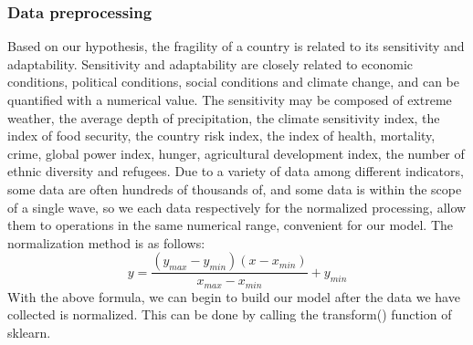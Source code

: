 \documentclass{mcmthesis}
\begin{document}
\newpage
\subsubsection{Data preprocessing}
Based on our hypothesis, the fragility of a country is related to its 
sensitivity and adaptability. Sensitivity and adaptability are closely 
related to economic conditions, political conditions, social conditions and 
climate change, and can be quantified with a numerical value. The sensitivity 
may be composed of extreme weather, the average depth of precipitation, the 
climate sensitivity index, the index of food security, the country risk index, 
the index of health, mortality, crime, global power index, hunger, agricultural 
development index, the number of ethnic diversity and refugees. Due to a variety 
of data among different indicators, some data are often hundreds of thousands of, 
and some data is within the scope of a single wave, so we each data respectively 
for the normalized processing, allow them to operations in the same numerical range, 
convenient for our model. The normalization method is as follows:
\[ y=\frac{\left ( y_{max}-y_{min} \right )\left ( x-x_{min} \right )}{x_{max}-x_{min}}+y_{min} \]
With the above formula, we can begin to build our model after the data we have 
collected is normalized. This can be done by calling the transform() function 
of sklearn. 
\end{document}
